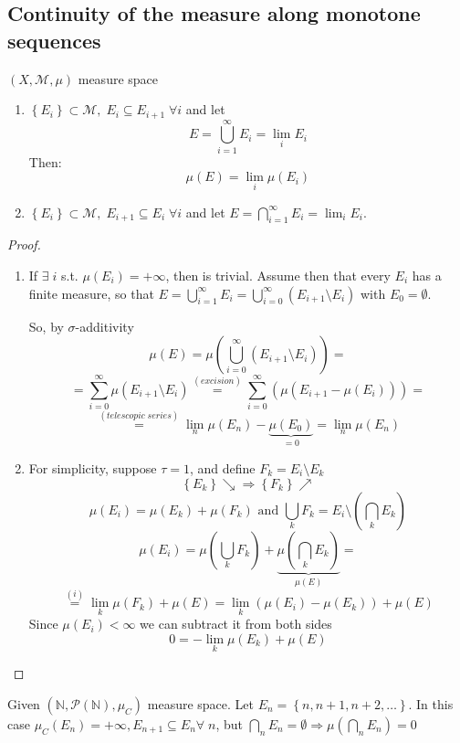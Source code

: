 \subsection{Continuity of the measure along monotone sequences}
\((X, \mathcal{M}, \mu)\) measure space
\begin{enumerate}
    \item \(\left\lbrace E_i \right\rbrace \subset \mathcal{M}, \; E_i \subseteq E_{i+1} \; \forall i\) and let \[
        E = \bigcup_{i = 1}^{\infty} E_i = \lim_i E_i
    \]
    Then:
    \[
        \mu(E) = \lim_i \mu(E_i)
    \]
    \item \(\left\lbrace E_i \right\rbrace \subset \mathcal{M}, \; E_{i+1} \subseteq E_{i} \; \forall i\) and let \(E = \bigcap_{i = 1}^{\infty} E_i = \lim_i E_i\).
\end{enumerate}
\begin{proof}
    \begin{enumerate}
        \item If \(\exists \; i\) s.t. \(\mu(E_i) = +\infty\), then is trivial. Assume then that every \(E_i\) has a finite measure, so that \(E = \bigcup_{i=1}^{\infty} E_i = \bigcup_{i=0}^{\infty}(E_{i+1}\setminus E_i)\) with \(E_0 = \emptyset\).
        
        So, by \(\sigma\)-additivity \[\mu(E) = \mu\left(\bigcup_{i=0}^{\infty}(E_{i+1}\setminus E_i)\right) = \]
        \[
            = \sum_{i = 0}^{\infty} \mu(E_{i + 1} \setminus E_i) \overset{(excision)}{=} \sum_{i=0}^{\infty}\left(\mu(E_{i+1} - \mu(E_i))\right) = 
        \]
        \[
            \overset{(telescopic \; series)}{=} \lim_n \mu(E_n) - \underbrace{\mu(E_0)}_{= 0} = \lim_n \mu(E_n)
        \]
        \item For simplicity, suppose \(\tau = 1\), and define \(F_k = E_i\setminus E_k\) 
        \[
            \left\lbrace E_k \right\rbrace \searrow \Rightarrow \left\lbrace F_k \right\rbrace \nearrow
        \]
        \[
            \mu(E_i) = \mu(E_k) + \mu(F_k) \mbox{ and } \bigcup_k F_k = E_i \setminus (\bigcap_k E_k)
        \]
        \[
            \mu(E_i) = \mu(\bigcup_k F_k) + \underbrace{\mu(\bigcap_k E_k)}_{\mu(E)} =
        \]
        \[
            \overset{(i)}{=} \lim_k \mu(F_k) + \mu(E) = \lim_k \left(\mu(E_i) - \mu(E_k)\right) + \mu(E)
        \]
        Since \(\mu(E_i) < \infty\) we can subtract it from both sides
        \[
            0 = -\lim_k \mu(E_k) + \mu(E)
        \]
    \end{enumerate}
\end{proof}
\begin{example}[Counterexample]
    Given \((\mathbb{N}, \mathcal{P}(\mathbb{N}), \mu_C)\) measure space. Let \(E_n = \left\lbrace n, n+1, n+2, \ldots\right\rbrace\). In this case \(\mu_C (E_n) = +\infty, E_{n+1} \subseteq E_n \forall \; n\), but \(\bigcap_n E_n = \emptyset \Rightarrow \mu\left(\bigcap_n E_n\right) = 0 \)
\end{example}
